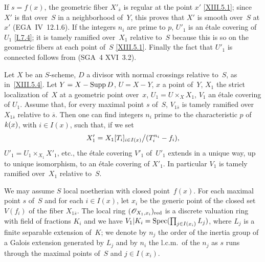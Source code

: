 If $s=f(x)$, the geometric fiber $X'_{\bar{s}}$ is
regular at the point $x'$ \eqref{XIII.5.1}; since $X'$ is flat
over~$S$ in a neighborhood of~$Y$, this proves that $X'$ is smooth over~$S$ at
$x'$ (EGA~IV~12.1.6). If the integers $n_i$ are prime to $p$,
$U'_1$ is an \'etale covering of~$U_1$ \eqref{I.7.4}; it is
tamely ramified over~$X_1$ relative to~$S$ because
this is so on the geometric fibers at each point of~$S$
\eqref{XIII.5.1}. Finally the fact that $U'_1$ is connected follows from
(SGA~4 XVI~3.2).

\begin{proposition}
\label{XIII.5.5}
Let $X$ be an $S$-scheme, $D$ a
divisor with normal crossings relative to~$S$, as
in~\eqref{XIII.5.4}. Let $Y=X-\operatorname{Supp} D$,
$U=X- Y$, $x$ a point of~$Y$, $X_{1}$ the strict
localization of~$X$ at a geometric point over~$x$,
$U_{1}=U\times_{X}X_{1}$, $V_{1}$ an \'etale covering of
$U_{1}$. Assume that, for every maximal point $s$ of~$S$,
$V_{1\overline{s}}$ is tamely ramified over~$X_{1\overline{s}}$ relative to $\overline{s}$. Then one can
find integers $n_{i}$ prime to the characteristic $p$
of~$\mathit{k}(x)$, with $i\in I(x)$, such that, if we set
$$
X'_{1}=X_{1}[T_{i}]_{i\in I(x)}\big/ (T_{i}^{n_{i}}-f_{i}) ,
$$
$U'_{1}=U_{1}\times_{X_{1}}X'_{1}$, etc., the \'etale covering
$V'_{1}$ of~$U'_{1}$ extends in a unique way, up to
unique isomorphism, to an \'etale covering of
$X'_{1}$. In particular
$V_{1}$ is tamely ramified over~$X_{1}$ relative
to~$S$.
\end{proposition}

We may assume $S$ local noetherian with closed point~$f(x)$.
For each maximal point $s$ of~$S$ and for each $i\in I(x)$, let
$x_{i}$ be the generic point of the closed set $V(f_{i})$ of the fiber
$X_{1\overline{s}}$. The local ring $(\cal{O}_{X_{1},x_{i}})_{\red}$
is a discrete valuation ring with field of fractions $K_{i}$
and we have
$V_{1}|K_{i}=\operatorname{Spec}(\prod_{j\in I(x_{i})}L_{j})$,
where $L_{j}$ is a finite separable extension of~$K$; we denote by
$n_{j}$ the order of the inertia group of a Galois extension
generated by $L_{j}$ and by $n_{i}$ the l.c.m.\ of the $n_{j}$ as
$s$ runs through the maximal points of~$S$ and
$j\in I(x_{i})$.

